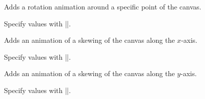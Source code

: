\begin{command}{\pgfsys@animaterotate}
  Adds a rotation animation around a specific point of the canvas.
  
  Specify values with |\pgfsys@animation@rotate|.
\begin{codeexample}[width=2cm]
\end{codeexample}
\begin{codeexample}[width=2cm]
\end{codeexample}
\end{command}

\begin{command}{\pgfsys@animateskewx}
  Adds an animation of a skewing of the canvas along the $x$-axis.
  
  Specify values with |\pgfsys@animation@scalar|.
\begin{codeexample}[width=2cm]
\end{codeexample}
\end{command}

\begin{command}{\pgfsys@animateskewy}
  Adds an animation of a skewing of the canvas along the $y$-axis.
  
  Specify values with |\pgfsys@animation@scalar|.
\end{command}

